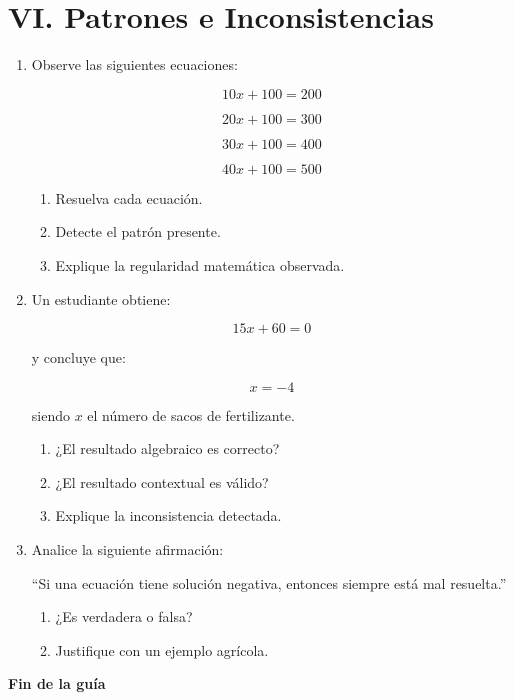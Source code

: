 \documentclass[12pt]{article}
\begin{document}
	\section*{VI. Patrones e Inconsistencias}
	
	\begin{enumerate}[label=\textbf{\arabic*.}, start=15]
		
		\item Observe las siguientes ecuaciones:
		
		\[
		10x + 100 = 200
		\]
		
		\[
		20x + 100 = 300
		\]
		
		\[
		30x + 100 = 400
		\]
		
		\[
		40x + 100 = 500
		\]
		
		\begin{enumerate}[label=\alph*)]
			\item Resuelva cada ecuación.
			\item Detecte el patrón presente.
			\item Explique la regularidad matemática observada.
		\end{enumerate}
		
		
		\item Un estudiante obtiene:
		
		\[
		15x + 60 = 0
		\]
		
		y concluye que:
		
		\[
		x = -4
		\]
		
		siendo \(x\) el número de sacos de fertilizante.
		
		\begin{enumerate}[label=\alph*)]
			\item ¿El resultado algebraico es correcto?
			\item ¿El resultado contextual es válido?
			\item Explique la inconsistencia detectada.
		\end{enumerate}
		
		
		\item Analice la siguiente afirmación:
		
		``Si una ecuación tiene solución negativa,
		entonces siempre está mal resuelta.''
		
		\begin{enumerate}[label=\alph*)]
			\item ¿Es verdadera o falsa?
			\item Justifique con un ejemplo agrícola.
		\end{enumerate}
		
	\end{enumerate}
	
	
	\begin{center}
		\Large
		\textbf{Fin de la guía}
	\end{center}
	
\end{document}
